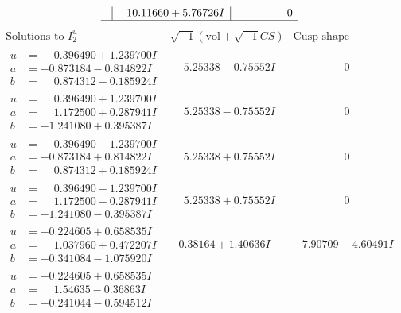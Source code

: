 \documentclass[1p]{elsarticle_modified}
\theoremstyle{definition}
\newcommand{\I}{\sqrt{-1}}
\begin{document}
$$\begin{array}{c|c|c}
 & \phantom{-}10.11660 + 5.76726 I & \phantom{-0.000000 } 0\\
 \hline 
 \end{array}$$\newpage$$\begin{array}{c|c|c}  
\text{Solutions to }I^u_{2}& \I (\text{vol} + \sqrt{-1}CS) & \text{Cusp shape}\\
 \hline 
\begin{aligned}
u &= \phantom{-}0.396490 + 1.239700 I \\
a &= -0.873184 - 0.814822 I \\
b &= \phantom{-}0.874312 - 0.185924 I\end{aligned}
 & \phantom{-}5.25338 - 0.75552 I & \phantom{-0.000000 } 0 \\ \hline\begin{aligned}
u &= \phantom{-}0.396490 + 1.239700 I \\
a &= \phantom{-}1.172500 + 0.287941 I \\
b &= -1.241080 + 0.395387 I\end{aligned}
 & \phantom{-}5.25338 - 0.75552 I & \phantom{-0.000000 } 0 \\ \hline\begin{aligned}
u &= \phantom{-}0.396490 - 1.239700 I \\
a &= -0.873184 + 0.814822 I \\
b &= \phantom{-}0.874312 + 0.185924 I\end{aligned}
 & \phantom{-}5.25338 + 0.75552 I & \phantom{-0.000000 } 0 \\ \hline\begin{aligned}
u &= \phantom{-}0.396490 - 1.239700 I \\
a &= \phantom{-}1.172500 - 0.287941 I \\
b &= -1.241080 - 0.395387 I\end{aligned}
 & \phantom{-}5.25338 + 0.75552 I & \phantom{-0.000000 } 0 \\ \hline\begin{aligned}
u &= -0.224605 + 0.658535 I \\
a &= \phantom{-}1.037960 + 0.472207 I \\
b &= -0.341084 - 1.075920 I\end{aligned}
 & -0.38164 + 1.40636 I & -7.90709 - 4.60491 I \\ \hline\begin{aligned}
u &= -0.224605 + 0.658535 I \\
a &= \phantom{-}1.54635 - 0.36863 I \\
b &= -0.241044 - 0.594512 I\end{aligned}

\end{array}$$
\end{document}

